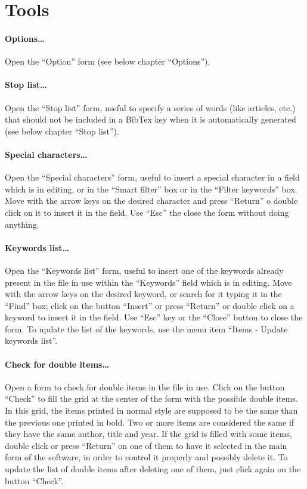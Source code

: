 \documentclass[a4paper,12pt]{report}
\begin{document}
\section{Tools}

\paragraph{Options\dots} Open the “Option” form (see below chapter “Options”).

\paragraph{Stop list\dots} Open the “Stop list” form, useful to specify a series of words (like articles, etc.) that should not be included in a BibTex key when it is automatically generated (see below chapter “Stop list”).

\paragraph{Special characters\dots  } Open the “Special characters” form, useful to insert a special character in a field which is in editing, or in the “Smart filter” box or in the “Filter keywords” box. Move with the arrow keys on the desired character and press “Return” o double click on it to insert it in the field. Use “Esc” the close the form without doing anything.

\paragraph{Keywords list\dots  } Open the “Keywords list” form, useful to insert one of the keywords already present in the file in use within the “Keywords” field which is in editing. Move with the arrow keys on the desired keyword, or search for it typing it in the “Find” box; click on the button “Insert” or press “Return” or double click on a keyword to insert it in the field. Use “Esc” key or the “Close” button to close the form. To update the list of the keywords, use the menu item “Items - Update keywords list”.

\paragraph{Check for double items\dots} Open a form to check for double items in the file in use. Click on the button “Check” to fill the grid at the center of the form with the possible double items. In this grid, the items printed in normal style are supposed to be the same than the previous one printed in bold. Two or more items are considered the same if they have the same author, title and year. If the grid is filled with some items, double click or press “Return” on one of them to have it selected in the main form of the software, in order to control it properly and possibly delete it. To update the list of double items after deleting one of them, just click again on the button “Check”.
\end{document}

